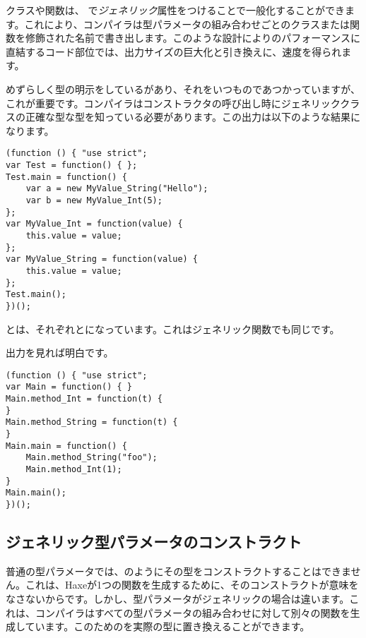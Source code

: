 クラスや関数は、 で\emph{ジェネリック}属性をつけることで一般化することができます。これにより、コンパイラは型パラメータの組み合わせごとのクラスまたは関数を修飾された名前で書き出します。このような設計によりのパフォーマンスに直結するコード部位では、出力サイズの巨大化と引き換えに、速度を得られます。


めずらしく型の明示をしているがあり、それをいつものであつかっていますが、これが重要です。コンパイラはコンストラクタの呼び出し時にジェネリッククラスの正確な型な型を知っている必要があります。この出力は以下のような結果になります。

\begin{lstlisting}
(function () { "use strict";
var Test = function() { };
Test.main = function() {
	var a = new MyValue_String("Hello");
	var b = new MyValue_Int(5);
};
var MyValue_Int = function(value) {
	this.value = value;
};
var MyValue_String = function(value) {
	this.value = value;
};
Test.main();
})();
\end{lstlisting}

とは、それぞれとになっています。これはジェネリック関数でも同じです。


出力を見れば明白です。

\begin{lstlisting}
(function () { "use strict";
var Main = function() { }
Main.method_Int = function(t) {
}
Main.method_String = function(t) {
}
Main.main = function() {
	Main.method_String("foo");
	Main.method_Int(1);
}
Main.main();
})();
\end{lstlisting}


\subsection{ジェネリック型パラメータのコンストラクト}
\label{type-system-generic-type-parameter-construction}


普通の型パラメータでは、のようにその型をコンストラクトすることはできません。これは、Haxeが1つの関数を生成するために、そのコンストラクトが意味をなさないからです。しかし、型パラメータがジェネリックの場合は違います。これは、コンパイラはすべての型パラメータの組み合わせに対して別々の関数を生成しています。このためのを実際の型に置き換えることができます。

